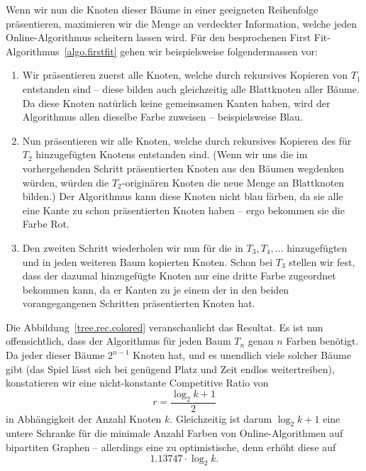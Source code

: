 \documentclass[11pt,abstracton]{scrreprt} %
\theoremstyle{definition}
\begin{document}
Wenn wir nun die Knoten dieser Bäume in einer geeigneten Reihenfolge präsentieren, maximieren wir die Menge an verdeckter Information, welche jeden Online-Algorithmus scheitern lassen wird. Für den besprochenen First Fit-Algorithmus~\ref{algo.firstfit} gehen wir beispielsweise folgendermassen vor:
\begin{enumerate}
\item Wir präsentieren zuerst alle Knoten, welche durch rekursives Kopieren von $T_1$ entstanden sind -- diese bilden auch gleichzeitig alle Blattknoten aller Bäume. Da diese Knoten natürlich keine gemeinsamen Kanten haben, wird der Algorithmus allen dieselbe Farbe zuweisen -- beispielsweise Blau.

\item Nun präsentieren wir alle Knoten, welche durch rekursives Kopieren des für $T_2$ hinzugefügten Knotens entstanden sind. (Wenn wir uns die im vorhergehenden Schritt präsentierten Knoten aus den Bäumen wegdenken würden, würden die $T_2$-originären Knoten die neue Menge an Blattknoten bilden.) Der Algorithmus kann diese Knoten nicht blau färben, da sie alle eine Kante zu schon präsentierten Knoten haben -- ergo bekommen sie die Farbe Rot.

\item Den zweiten Schritt wiederholen wir nun für die in $T_3, T_4,\dots$ hinzugefügten und in jeden weiteren Baum kopierten Knoten. Schon bei $T_3$ stellen wir fest, dass der dazumal hinzugefügte Knoten nur eine dritte Farbe zugeordnet bekommen kann, da er Kanten zu je einem der in den beiden vorangegangenen Schritten präsentierten Knoten hat.
\end{enumerate}

Die Abbildung~\ref{tree.rec.colored} veranschaulicht das Resultat. Es ist nun offensichtlich, dass der Algorithmus für jeden Baum $T_n$ genau $n$ Farben benötigt. Da jeder dieser Bäume $2^{n-1}$ Knoten hat, und es unendlich viele solcher Bäume gibt (das Spiel lässt sich bei genügend Platz und Zeit endlos weitertreiben), konstatieren wir eine nicht-konstante Competitive Ratio von
\[
	r = \frac {\log_2 k + 1} {2}
\]
in Abhängigkeit der Anzahl Knoten $k$. Gleichzeitig ist darum $\log_2 k+1$ eine untere Schranke für die minimale Anzahl Farben von Online-Algorithmen auf bipartiten Graphen -- allerdings eine zu optimistische, denn \cite{bipartite} erhöht diese auf
\[
	1.13747 \cdot \log_2 k.
\]
\end{document}
